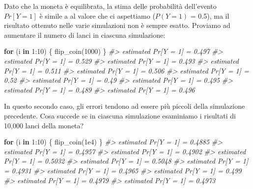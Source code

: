\documentclass[
  11pt,
]{krantz}
\makeatletter
\newenvironment{Shaded}{\begin{snugshade}}{\end{snugshade}}
\newcommand{\CommentTok}[1]{\textcolor[rgb]{0.37,0.37,0.37}{\textit{#1}}}
\newcommand{\ControlFlowTok}[1]{\textcolor[rgb]{0.27,0.27,0.27}{\textbf{#1}}}
\newcommand{\DecValTok}[1]{\textcolor[rgb]{0.06,0.06,0.06}{#1}}
\newcommand{\FloatTok}[1]{\textcolor[rgb]{0.06,0.06,0.06}{#1}}
\newcommand{\FunctionTok}[1]{\textcolor[rgb]{0,0,0}{#1}}
\newcommand{\NormalTok}[1]{#1}
\newcommand{\SpecialCharTok}[1]{\textcolor[rgb]{0,0,0}{#1}}
\newenvironment{kframe}{%
\medskip{}
\setlength{\fboxsep}{.8em}
 \def\at@end@of@kframe{}%
 \ifinner\ifhmode%
  \def\at@end@of@kframe{\end{minipage}}%
  \begin{minipage}{\columnwidth}%
 \fi\fi%
 \def\FrameCommand##1{\hskip\@totalleftmargin \hskip-\fboxsep
 \colorbox{shadecolor}{##1}\hskip-\fboxsep
     \hskip-\linewidth \hskip-\@totalleftmargin \hskip\columnwidth}%
 \MakeFramed {\advance\hsize-\width
   \@totalleftmargin\z@ \linewidth\hsize
   \@setminipage}}%
 {\par\unskip\endMakeFramed%
 \at@end@of@kframe}
\renewenvironment{Shaded}{\begin{kframe}}{\end{kframe}}
\theoremstyle{definition}
\theoremstyle{definition}
\theoremstyle{definition}
\theoremstyle{definition}
\theoremstyle{remark}
\makeatother
\begin{document}
Dato che la moneta è equilibrata, la stima delle probabilità dell'evento \(Pr[Y = 1]\) è simile a al valore che ci aspettiamo (\(P(Y = 1)\) = 0.5), ma il risultato ottenuto nelle varie simulazioni non è sempre esatto. Proviamo ad aumentare il numero di lanci in ciascuna simulazione:

\begin{Shaded}
\begin{Highlighting}[]
\ControlFlowTok{for}\NormalTok{ (i }\ControlFlowTok{in} \DecValTok{1}\SpecialCharTok{:}\DecValTok{10}\NormalTok{) \{}
  \FunctionTok{flip\_coin}\NormalTok{(}\DecValTok{1000}\NormalTok{)}
\NormalTok{\}}
\CommentTok{\#\textgreater{} estimated Pr[Y = 1] = 0.497 }
\CommentTok{\#\textgreater{} estimated Pr[Y = 1] = 0.529 }
\CommentTok{\#\textgreater{} estimated Pr[Y = 1] = 0.493 }
\CommentTok{\#\textgreater{} estimated Pr[Y = 1] = 0.511 }
\CommentTok{\#\textgreater{} estimated Pr[Y = 1] = 0.506 }
\CommentTok{\#\textgreater{} estimated Pr[Y = 1] = 0.52 }
\CommentTok{\#\textgreater{} estimated Pr[Y = 1] = 0.49 }
\CommentTok{\#\textgreater{} estimated Pr[Y = 1] = 0.495 }
\CommentTok{\#\textgreater{} estimated Pr[Y = 1] = 0.489 }
\CommentTok{\#\textgreater{} estimated Pr[Y = 1] = 0.496}
\end{Highlighting}
\end{Shaded}

In questo secondo caso, gli errori tendono ad essere più piccoli della simulazione precedente. Cosa succede se in ciascuna simulazione esaminiamo i risultati di 10,000 lanci della moneta?

\begin{Shaded}
\begin{Highlighting}[]
\ControlFlowTok{for}\NormalTok{ (i }\ControlFlowTok{in} \DecValTok{1}\SpecialCharTok{:}\DecValTok{10}\NormalTok{) \{}
  \FunctionTok{flip\_coin}\NormalTok{(}\FloatTok{1e4}\NormalTok{)}
\NormalTok{\}}
\CommentTok{\#\textgreater{} estimated Pr[Y = 1] = 0.4885 }
\CommentTok{\#\textgreater{} estimated Pr[Y = 1] = 0.4957 }
\CommentTok{\#\textgreater{} estimated Pr[Y = 1] = 0.4902 }
\CommentTok{\#\textgreater{} estimated Pr[Y = 1] = 0.5032 }
\CommentTok{\#\textgreater{} estimated Pr[Y = 1] = 0.5048 }
\CommentTok{\#\textgreater{} estimated Pr[Y = 1] = 0.4931 }
\CommentTok{\#\textgreater{} estimated Pr[Y = 1] = 0.4965 }
\CommentTok{\#\textgreater{} estimated Pr[Y = 1] = 0.499 }
\CommentTok{\#\textgreater{} estimated Pr[Y = 1] = 0.4979 }
\CommentTok{\#\textgreater{} estimated Pr[Y = 1] = 0.4973}
\end{Highlighting}
\end{Shaded}
\end{document}
